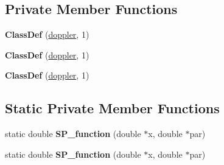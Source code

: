 \subsection*{Private Member Functions}
\begin{DoxyCompactItemize}
\item 
\mbox{\label{classdoppler_ade7546707b0924034fea20592ea8be3f}} 
{\bfseries Class\+Def} (\hyperlink{classdoppler}{doppler}, 1)
\item 
\mbox{\label{classdoppler_ade7546707b0924034fea20592ea8be3f}} 
{\bfseries Class\+Def} (\hyperlink{classdoppler}{doppler}, 1)
\item 
\mbox{\label{classdoppler_ade7546707b0924034fea20592ea8be3f}} 
{\bfseries Class\+Def} (\hyperlink{classdoppler}{doppler}, 1)
\end{DoxyCompactItemize}
\subsection*{Static Private Member Functions}
\begin{DoxyCompactItemize}
\item 
\mbox{\label{classdoppler_a796802036480843f258b284f5832bd98}} 
static double {\bfseries S\+P\+\_\+function} (double $\ast$x, double $\ast$par)
\item 
\mbox{\label{classdoppler_a624531c02ac2c5bbb07755047b36970a}} 
static double {\bfseries S\+P\+\_\+function} (double $\ast$x, double $\ast$par)
\end{DoxyCompactItemize}
